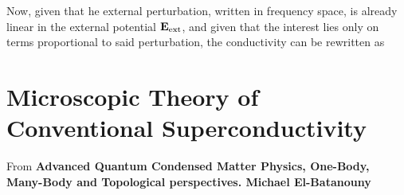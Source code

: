 \documentclass{homework}
\begin{document}
Now, given that he external perturbation, written in frequency space, is already linear in the external potential ${\bf E}_{\textnormal{ext}}$, and given that the interest lies only on terms proportional to said perturbation, the conductivity can be rewritten as 

\clearpage

\section{Microscopic Theory of Conventional Superconductivity}

From \textbf{Advanced Quantum Condensed Matter Physics, One-Body, Many-Body and Topological perspectives. Michael El-Batanouny} \\

\paragraph{\textbf{}}





\end{document}
